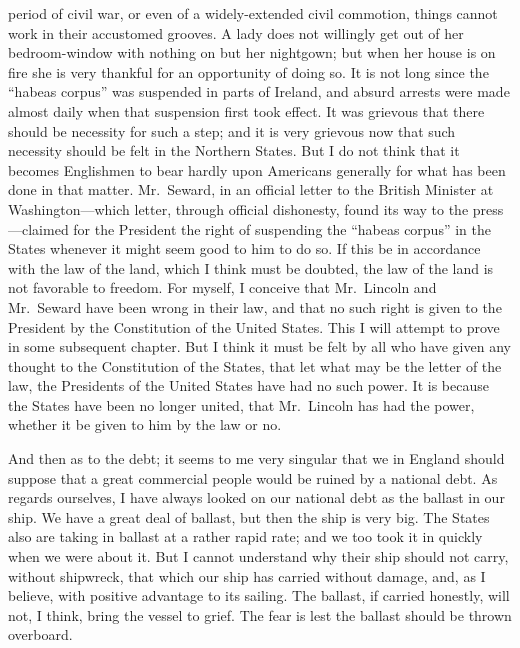 period of civil war, or even of a widely-extended civil commotion,
things cannot work in their accustomed grooves.  A lady does not
willingly get out of her bedroom-window with nothing on but her
nightgown; but when her house is on fire she is very thankful for
an opportunity of doing so.  It is not long since the ``habeas
corpus'' was suspended in parts of Ireland, and absurd arrests were
made almost daily when that suspension first took effect.  It was
grievous that there should be necessity for such a step; and it is
very grievous now that such necessity should be felt in the
Northern States.  But I do not think that it becomes Englishmen to
bear hardly upon Americans generally for what has been done in that
matter.  Mr.\ Seward, in an official letter to the British Minister
at Washington---which letter, through official dishonesty, found its
way to the press---claimed for the President the right of suspending
the ``habeas corpus'' in the States whenever it might seem good to
him to do so.  If this be in accordance with the law of the land,
which I think must be doubted, the law of the land is not favorable
to freedom.  For myself, I conceive that Mr.\ Lincoln and Mr.\ Seward
have been wrong in their law, and that no such right is given to
the President by the Constitution of the United States.  This I
will attempt to prove in some subsequent chapter.  But I think it
must be felt by all who have given any thought to the Constitution
of the States, that let what may be the letter of the law, the
Presidents of the United States have had no such power.  It is
because the States have been no longer united, that Mr.\ Lincoln has
had the power, whether it be given to him by the law or no.

And then as to the debt; it seems to me very singular that we in
England should suppose that a great commercial people would be
ruined by a national debt.  As regards ourselves, I have always
looked on our national debt as the ballast in our ship.  We have a
great deal of ballast, but then the ship is very big.  The States
also are taking in ballast at a rather rapid rate; and we too took
it in quickly when we were about it.  But I cannot understand why
their ship should not carry, without shipwreck, that which our ship
has carried without damage, and, as I believe, with positive
advantage to its sailing.  The ballast, if carried honestly, will
not, I think, bring the vessel to grief.  The fear is lest the
ballast should be thrown overboard.

